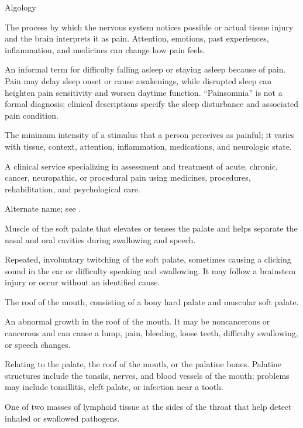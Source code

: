 \synonyms
Algology

 The process by which the nervous system notices possible or actual tissue injury and the brain interprets it as pain. Attention, emotions, past experiences, inflammation, and medicines can change how pain feels.

 An informal term for difficulty falling asleep or staying asleep because of pain. Pain may delay sleep onset or cause awakenings,
while disrupted sleep can heighten pain sensitivity and worsen daytime function.
“Painsomnia” is not a formal diagnosis; clinical descriptions specify the sleep
disturbance and associated pain condition.

 The minimum intensity of a stimulus that a person perceives as painful; it varies with tissue, context, attention, inflammation, medications, and neurologic state.

 A clinical service specializing in assessment and treatment of acute, chronic, cancer, neuropathic, or procedural pain using medicines, procedures, rehabilitation, and psychological care.

 Alternate name; see .

 Muscle of the soft palate that elevates or tenses the palate and helps separate the nasal and oral cavities during swallowing and speech.

 Repeated, involuntary twitching of the soft palate, sometimes causing a clicking sound in the ear or difficulty speaking and swallowing. It may follow a brainstem injury or occur without an identified cause.

 The roof of the mouth, consisting of a bony hard palate and muscular soft palate.

 An abnormal growth in the roof of the mouth. It may be noncancerous or cancerous and can cause a lump, pain, bleeding, loose teeth, difficulty swallowing, or speech changes.

 Relating to the palate, the roof of the mouth, or the palatine bones. Palatine structures include the tonsils, nerves, and blood vessels of the mouth; problems may include tonsillitis, cleft palate, or infection near a tooth.

 One of two masses of lymphoid tissue at the sides of the throat that help detect inhaled or swallowed pathogens.

